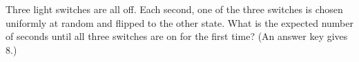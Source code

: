 Three light switches are all off. Each second, one of the three switches is chosen uniformly at random and flipped to the other state. What is the expected number of seconds until all three switches are on for the first time? (An answer key gives $8$.)
